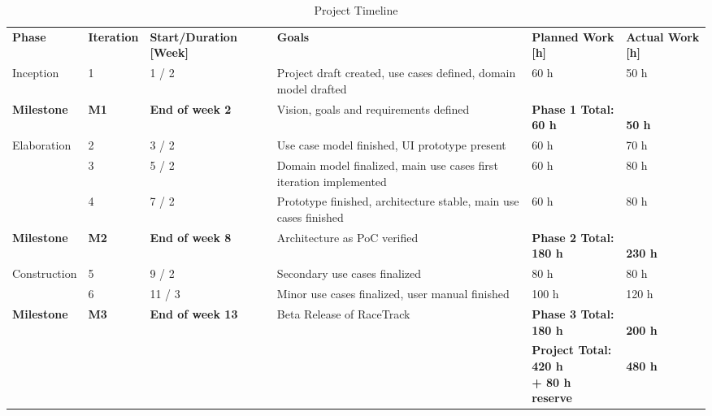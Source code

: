 		\begin{table}[ht]
			\begin{tabularx}{\textwidth}{l X X X X X}
				\hline
				\textbf{Phase}			& \textbf{Iteration}	& \textbf{Start/Duration [Week]}	& \textbf{Goals}														& \textbf{Planned Work [h]}											& \textbf{Actual Work [h]} \\
				Inception				& 1						& 1 / 2								& Project draft created, use cases defined, domain model drafted		& 60 h																& 50 h \\
				\textbf{Milestone}		& \textbf{M1}			& \textbf{End of week 2}			& Vision, goals and requirements defined								& \textbf{Phase 1 Total: \newline 60 h}								& \textbf{ \newline 50 h} \\
				Elaboration				& 2						& 3 / 2								& Use case model finished, UI prototype present							& 60 h																& 70 h \\
										& 3						& 5 / 2								& Domain model finalized, main use cases first iteration implemented	& 60 h																& 80 h \\
										& 4						& 7 / 2								& Prototype finished, architecture stable, main use cases finished		& 60 h																& 80 h \\
				\textbf{Milestone}		& \textbf{M2}			& \textbf{End of week 8}			& Architecture as PoC verified											& \textbf{Phase 2 Total: \newline 180 h}							& \textbf{ \newline 230 h} \\
				Construction			& 5						& 9 / 2								& Secondary use cases finalized											& 80 h																& 80 h \\
										& 6						& 11 / 3							& Minor use cases finalized, user manual finished						& 100 h																& 120 h \\
				\textbf{Milestone}		& \textbf{M3}			& \textbf{End of week 13}			& Beta Release of RaceTrack												& \textbf{Phase 3 Total: \newline 180 h}							& \textbf{ \newline 200 h} \\
										& 						& 									& 																		& \textbf{Project Total: \newline 420 h \newline + 80 h reserve} 	& \textbf{ \newline 480 h} \\
				\hline
			\end{tabularx}
			\caption{Project Timeline}
		\end{table}

